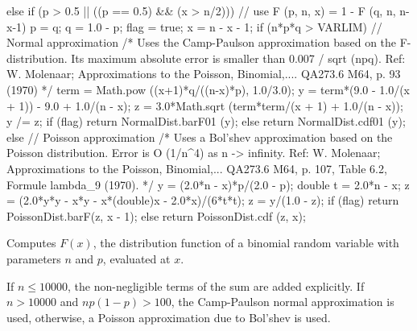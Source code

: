 \begin{code}
\begin{hide}
{{      } else {
         if (p > 0.5 || ((p == 0.5) && (x > n/2))) {
            // use F (p, n, x) = 1 - F (q, n, n-x-1)
            p = q;
            q = 1.0 - p;
            flag = true;
            x = n - x - 1;
         }
         if (n*p*q > VARLIM) {   // Normal approximation
            /* Uses the Camp-Paulson approximation based on the F-distribution.
               Its maximum absolute error is smaller than 0.007 / sqrt (npq).
               Ref: W. Molenaar; Approximations to the Poisson, Binomial,....
               QA273.6 M64, p. 93 (1970) */
            term = Math.pow ((x+1)*q/((n-x)*p), 1.0/3.0);
            y = term*(9.0 - 1.0/(x + 1)) - 9.0 + 1.0/(n - x);
            z = 3.0*Math.sqrt (term*term/(x + 1) + 1.0/(n - x));
            y /= z;
            if (flag)
               return NormalDist.barF01 (y);
            else
               return NormalDist.cdf01 (y);
         }
         else {                    // Poisson approximation
            /* Uses a Bol'shev approximation based on the Poisson distribution.
               Error is O (1/n^4) as n -> infinity. Ref: W. Molenaar;
             Approximations to the Poisson, Binomial,... QA273.6 M64, p. 107,
               Table 6.2, Formule lambda_9 (1970). */
            y = (2.0*n - x)*p/(2.0 - p);
            double t = 2.0*n - x;
            z = (2.0*y*y - x*y - x*(double)x - 2.0*x)/(6*t*t);
            z = y/(1.0 - z);
            if (flag)
               return PoissonDist.barF(z, x - 1);
            else
               return PoissonDist.cdf (z, x);
         }
      }
   }\end{hide}
\end{code}
  \begin{tabb}  Computes $F(x)$, the distribution function of a
  binomial
  random variable with parameters $n$ and $p$, evaluated at $x$.
\begin{detailed}
  If $n \le 10000$, the non-negligible terms of the sum are
  added explicitly.
  If $n > 10000$ and $np (1-p) > 100$, the Camp-Paulson normal
  approximation \cite{tCAM51a,tMOL70a} is used, otherwise, a Poisson
  approximation due to Bol'shev \cite{tBOL64a,tMOL70a} is used.
\end{detailed}
 \end{tabb}
